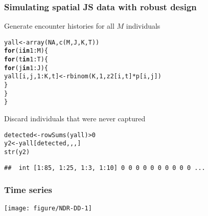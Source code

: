 \documentclass[color=usenames,dvipsnames]{beamer}\usepackage[]{graphicx}\usepackage[]{color}
\makeatletter
\newcommand{\hlnum}[1]{\textcolor[rgb]{0.69,0.494,0}{#1}}%
\newcommand{\hlopt}[1]{\textcolor[rgb]{0,0,0}{#1}}%
\newcommand{\hlstd}[1]{\textcolor[rgb]{0,0,0}{#1}}%
\newcommand{\hlkwa}[1]{\textcolor[rgb]{0,0,0}{\textbf{#1}}}%
\newcommand{\hlkwb}[1]{\textcolor[rgb]{0,0.341,0.682}{#1}}%
\newcommand{\hlkwd}[1]{\textcolor[rgb]{0.004,0.004,0.506}{#1}}%
\newenvironment{kframe}{%
 \def\at@end@of@kframe{}%
 \ifinner\ifhmode%
  \def\at@end@of@kframe{\end{minipage}}%
  \begin{minipage}{\columnwidth}%
 \fi\fi%
 \def\FrameCommand##1{\hskip\@totalleftmargin \hskip-\fboxsep
 \colorbox{shadecolor}{##1}\hskip-\fboxsep
     \hskip-\linewidth \hskip-\@totalleftmargin \hskip\columnwidth}%
 \MakeFramed {\advance\hsize-\width
   \@totalleftmargin\z@ \linewidth\hsize
   \@setminipage}}%
 {\par\unskip\endMakeFramed%
 \at@end@of@kframe}
\newenvironment{knitrout}{}{} %
\makeatother
\begin{document}
\begin{frame}[fragile]
  \frametitle{Simulating spatial JS data with robust design}
{Generate encounter histories for all $M$ individuals}
\footnotesize
\begin{knitrout}
\color{fgcolor}\begin{kframe}
\begin{alltt}
\hlstd{yall} \hlkwb{<-} \hlkwd{array}\hlstd{(}\hlnum{NA}\hlstd{,} \hlkwd{c}\hlstd{(M, J, K, T))}
\hlkwa{for}\hlstd{(i} \hlkwa{in} \hlnum{1}\hlopt{:}\hlstd{M) \{}
    \hlkwa{for}\hlstd{(t} \hlkwa{in} \hlnum{1}\hlopt{:}\hlstd{T) \{}
        \hlkwa{for}\hlstd{(j} \hlkwa{in} \hlnum{1}\hlopt{:}\hlstd{J) \{}
            \hlstd{yall[i,j,}\hlnum{1}\hlopt{:}\hlstd{K,t]} \hlkwb{<-} \hlkwd{rbinom}\hlstd{(K,} \hlnum{1}\hlstd{, z2[i,t]}\hlopt{*}\hlstd{p[i,j])}
        \hlstd{\}}
    \hlstd{\}}
\hlstd{\}}
\end{alltt}
\end{kframe}
\end{knitrout}
\pause
\vfill
{\normalsize Discard individuals that were never captured}
\begin{knitrout}
\color{fgcolor}\begin{kframe}
\begin{alltt}
\hlstd{detected} \hlkwb{<-} \hlkwd{rowSums}\hlstd{(yall)} \hlopt{>} \hlnum{0}
\hlstd{y2} \hlkwb{<-} \hlstd{yall[detected,,,]}
\hlkwd{str}\hlstd{(y2)}
\end{alltt}
\begin{verbatim}
##  int [1:85, 1:25, 1:3, 1:10] 0 0 0 0 0 0 0 0 0 0 ...
\end{verbatim}
\end{kframe}
\end{knitrout}
\end{frame}






\begin{frame}[fragile]
  \frametitle{Time series}
  \tiny

\vspace{-3mm}
\begin{center}
  \texttt{[image: figure/NDR-DD-1]}
\end{center}
\end{frame}
\end{document}
